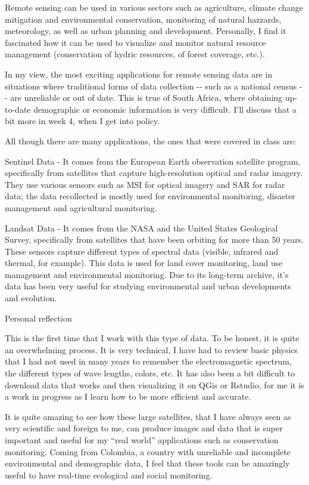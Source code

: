 \documentclass[
  letterpaper,
  DIV=11,
  numbers=noendperiod]{scrreprt}
\begin{document}
Remote sensing can be used in various sectors such as agriculture,
climate change mitigation and environmental conservation, monitoring of
natural hazzards, meteorology, as well as urban planning and
development. Personally, I find it fascinated how it can be used to
visualize and monitor natural resource management (conservation of
hydric resources, of forest coverage, etc.).

In my view, the most exciting applications for remote sensing data are
in situations where traditional forms of data collection -\/- such as a
national census -\/- are unreliable or out of date. This is true of
South Africa, where obtaining up-to-date demographic or economic
information is very difficult. I'll discuss that a bit more in week 4,
when I get into policy.

All though there are many applications, the ones that were covered in
class are:

Sentinel Data - It comes from the European Earth observation satellite
program, specifically from satellites that capture high-resolution
optical and radar imagery. They use various sensors such as MSI for
optical imagery and SAR for radar data; the data recollected is mostly
used for environmental monitoring, disaster management and agricultural
monitoring.

Landsat Data - It comes from the NASA and the United States Geological
Survey, specifically from satellites that have been orbiting for more
than 50 years. These sensors capture different types of spectral data
(visible, infrared and thermal, for example). This data is used for land
cover monitoring, land use management and environmental monitoring. Due
to its long-term archive, it's data has been very useful for studying
environmental and urban developments and evolution.

Personal reflection

This is the first time that I work with this type of data. To be honest,
it is quite an overwhelming process. It is very technical, I have had to
review basic physics that I had not used in many years to remember the
electromagnetic spectrum, the different types of wave lengths, colors,
etc. It has also been a bit difficult to download data that works and
then visualizing it on QGis or Rstudio, for me it is a work in progress
as I learn how to be more efficient and accurate.

It is quite amazing to see how these large satellites, that I have
always seen as very scientific and foreign to me, can produce images and
data that is super important and useful for my ``real world''
applications such as conservation monitoring. Coming from Colombia, a
country with unreliable and incomplete environmental and demographic
data, I feel that these tools can be amazingly useful to have real-time
ecological and social monitoring.
\end{document}

